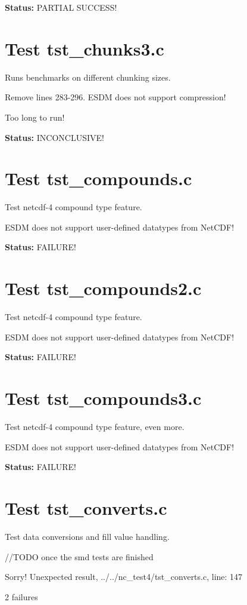 {\bf \large Status: } PARTIAL SUCCESS!

\section{Test tst\_chunks3.c}

Runs benchmarks on different chunking sizes.

Remove lines 283-296. ESDM does not support compression!

Too long to run!

{\bf \large Status: } INCONCLUSIVE!

\section{Test tst\_compounds.c}

Test netcdf-4 compound type feature.

ESDM does not support user-defined datatypes from NetCDF!

{\bf \large Status: } FAILURE!

\section{Test tst\_compounds2.c}

Test netcdf-4 compound type feature.

ESDM does not support user-defined datatypes from NetCDF!

{\bf \large Status: } FAILURE!

\section{Test tst\_compounds3.c}

Test netcdf-4 compound type feature, even more.

ESDM does not support user-defined datatypes from NetCDF!

{\bf \large Status: } FAILURE!

\section{Test tst\_converts.c}

Test data conversions and fill value handling.

//TODO once the smd tests are finished

Sorry! Unexpected result, ../../nc\_test4/tst\_converts.c, line: 147

2 failures

